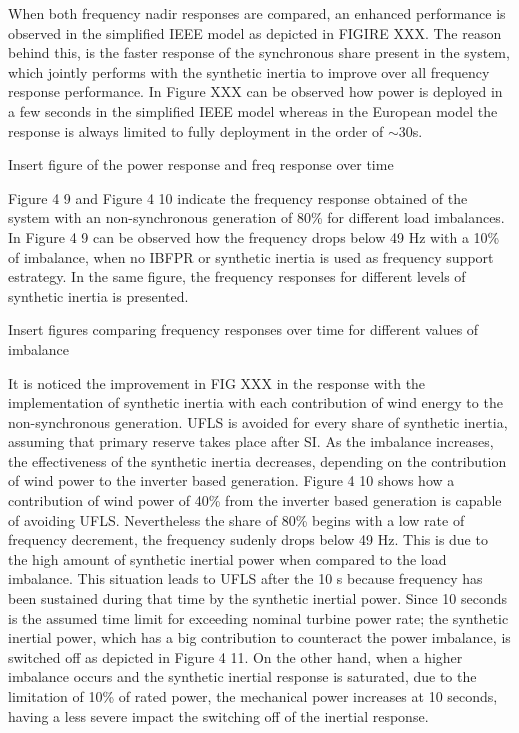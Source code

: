 When both frequency nadir responses are compared, an enhanced performance is observed in the simplified IEEE model as depicted in FIGIRE XXX. The reason behind this, is the faster response of the synchronous share present in the system, which jointly performs with the synthetic inertia to improve over all frequency response performance. In Figure XXX can be observed how power is deployed in a few seconds in the simplified IEEE model whereas in the European model the response is always limited to fully deployment in the order of $ \sim 30 $s.

Insert figure of the power response and freq response over time

Figure 4 9 and Figure 4 10 indicate the frequency response obtained of the system with an non-synchronous generation of 80\% for different load imbalances.  
In Figure 4 9 can be observed how the frequency drops below 49 Hz with a 10\% of imbalance, when no IBFPR or synthetic inertia is used as frequency support estrategy. In the same figure, the frequency responses for different levels of synthetic inertia is presented. 

Insert figures comparing frequency responses over time for different values of imbalance

It is noticed the improvement in FIG XXX in the response with the implementation of synthetic inertia with each contribution of wind energy to the non-synchronous generation. UFLS is avoided for every share of synthetic inertia, assuming that primary reserve takes place after SI. As the imbalance increases, the effectiveness of the synthetic inertia decreases, depending on the contribution of wind power to the inverter based generation. Figure 4 10 shows how a contribution of wind power of 40\% from the inverter based generation is capable of avoiding UFLS. Nevertheless the share of 80\% begins with a low rate of frequency decrement, the frequency sudenly drops below 49 Hz. This is due to the high amount of synthetic inertial power when compared to the load imbalance. This situation leads to UFLS after the 10 s because frequency has been sustained during that time by the synthetic inertial power. Since 10 seconds is the assumed time limit for exceeding nominal turbine power rate; the synthetic inertial power, which has a big contribution to counteract the power imbalance, is switched off as depicted in Figure 4 11. On the other hand, when a higher imbalance occurs and the synthetic inertial response is saturated, due to the limitation of 10\% of rated power, the mechanical power increases at 10 seconds, having a less severe impact the switching off of the inertial response.



